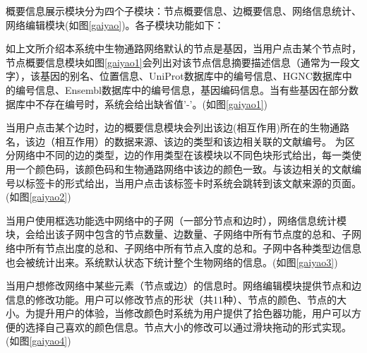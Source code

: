 概要信息展示模块分为四个子模块：节点概要信息、边概要信息、网络信息统计、网络编辑模块(如图\ref{gaiyao})。各子模块功能如下：

如上文所介绍本系统中生物通路网络默认的节点是基因，当用户点击某个节点时，节点概要信息模块如图\ref{gaiyao1}会列出对该节点信息摘要描述信息（通常为一段文字），该基因的别名、位置信息、UniProt\cite{uniprot2014uniprot}数据库中的编号信息、HGNC\cite{povey2001hugo}数据库中的编号信息、Ensembl\cite{cunningham2014ensembl}数据库中的编号信息，基因编码信息。当有些基因在部分数据库中不存在编号时，系统会给出缺省值'-'。(如图\ref{gaiyao1})

当用户点击某个边时，边的概要信息模块会列出该边(相互作用)所在的生物通路名，该边（相互作用）的数据来源、该边的类型和该边相关联的文献编号。 为区分网络中不同的边的类型，边的作用类型在该模块以不同色块形式给出，每一类使用一个颜色码，该颜色码和生物通路网络中该边的颜色一致。与该边相关的文献编号以标签卡的形式给出，当用户点击该标签卡时系统会跳转到该文献来源的页面。(如图\ref{gaiyao2})

当用户使用框选功能选中网络中的子网（一部分节点和边时），网络信息统计模块，会给出该子网中包含的节点数量、边数量、子网络中所有节点度的总和、子网络中所有节点出度的总和、子网络中所有节点入度的总和。子网中各种类型边信息也会被统计出来。系统默认状态下统计整个生物网络的信息。(如图\ref{gaiyao3})

当用户想修改网络中某些元素（节点或边）的信息时。网络编辑模块提供节点和边信息的修改功能。用户可以修改节点的形状（共11种）、节点的颜色、节点的大小。为提升用户的体验，当修改颜色时系统为用户提供了拾色器功能，用户可以方便的选择自己喜欢的颜色信息。节点大小的修改可以通过滑块拖动的形式实现。(如图\ref{gaiyao4})


